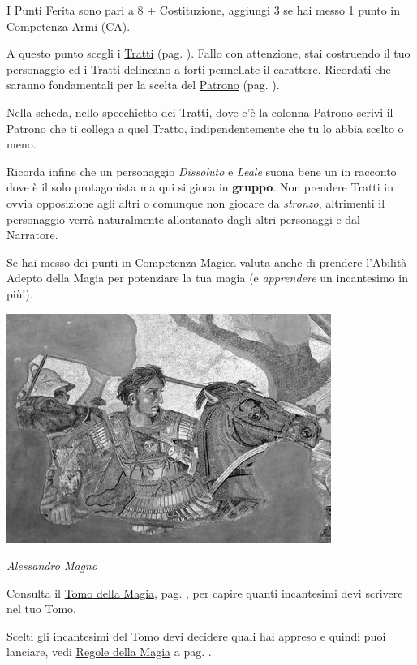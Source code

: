 \begin{multicols}{2}
I Punti Ferita sono pari a 8 + Costituzione, aggiungi 3 se hai messo 1 punto in Competenza Armi (CA).

A questo punto scegli i \hyperlink{tratti}{Tratti} (pag. \pageref{tratti}). Fallo con attenzione, stai costruendo il tuo personaggio ed i Tratti delineano a forti pennellate il carattere. Ricordati che saranno fondamentali per la scelta del \hyperlink{patroni}{Patrono} (pag. \pageref{patroni}).

Nella scheda, nello specchietto dei Tratti, dove c'è la colonna Patrono scrivi il Patrono che ti collega a quel Tratto, indipendentemente che tu lo abbia scelto o meno.

Ricorda infine che un personaggio \emph{Dissoluto} e \emph{Leale} suona bene un in racconto dove è il solo protagonista ma qui si gioca in \textbf{gruppo}. Non prendere Tratti in ovvia opposizione agli altri o comunque non giocare da \emph{stronzo}, altrimenti il personaggio verrà naturalmente allontanato dagli altri personaggi e dal Narratore.

Se hai messo dei punti in Competenza Magica valuta anche di prendere l'Abilità Adepto della Magia per potenziare la tua magia (e \emph{apprendere} un incantesimo in più!).


\begin{center}
\includegraphics[width=0.85\linewidth]{immagini/Alexander_and_Bucephalus_-_Battle_of_Issus_mosaic.png}

\emph{Alessandro Magno}
\end{center}

Consulta il \hyperlink{tomocm1}{Tomo della Magia}, pag. \pageref{tomocm1}, per capire quanti incantesimi devi scrivere nel tuo Tomo.

Scelti gli incantesimi del Tomo devi decidere quali hai appreso e quindi puoi lanciare, vedi \hyperlink{incantesimicm1}{Regole della Magia} a pag. \pageref{incantesimicm1}.


\end{multicols}
